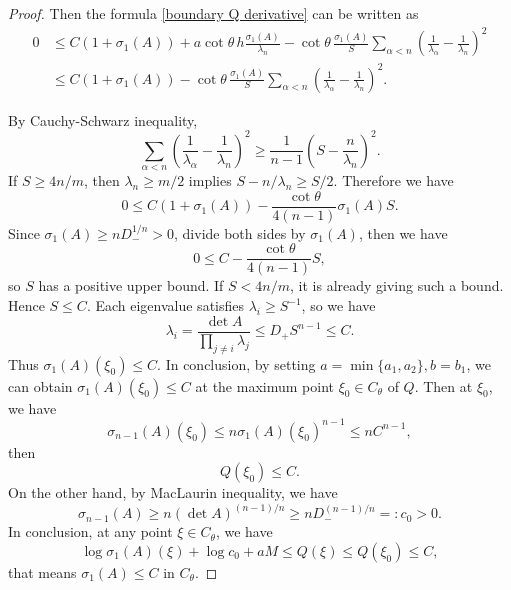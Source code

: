 \documentclass[10pt,a4paper]{amsart}
\begin{document}
\begin{proof}
Then the formula \eqref{boundary Q derivative} can be written as
\begin{equation}\label{boundary inequality} 
\begin{split}
        0&\leq 
        C(1+\sigma_1(A))
        +a\cot\theta\,h\frac{\sigma_1(A)}{\lambda_n}-\cot\theta\,\frac{\sigma_1(A)}{S}
        \sum_{\alpha<n}\left(\frac1{\lambda_{\alpha}}
        -\frac1{\lambda_n}\right)^2\\
        &\leq 
        C(1+\sigma_1(A))-\cot\theta\,\frac{\sigma_1(A)}{S}
        \sum_{\alpha<n}\left(\frac1{\lambda_{\alpha}}
        -\frac1{\lambda_n}\right)^2.
\end{split}
\end{equation}

By Cauchy-Schwarz inequality,
\[
        \sum_{\alpha<n}\left(\frac1{\lambda_{\alpha}}
        -\frac1{\lambda_n}\right)^2
        \geq\frac1{n-1}\left(S-\frac n{\lambda_n}\right)^2.
\]
If $S\geq4n/m$, then $\lambda_n\geq m/2$ implies
$S-n/\lambda_n\geq S/2$. Therefore we have
\begin{equation}\label{s4-4}
        0\leq C(1+\sigma_1(A))
        -\frac{\cot\theta}{4(n-1)}\sigma_1(A)S.
\end{equation}
Since $\sigma_1(A)\geq nD_-^{1/n}>0$, divide both sides by $\sigma_1(A)$, then we have
$$0\leq C - \frac{\cot\theta}{4(n-1)}S,$$
so $S$ has a positive upper bound. If $S<4n/m$, it is already giving such a bound.
Hence $S\leq C$. Each eigenvalue satisfies
$\lambda_i\geq S^{-1}$, so we have
\[
        \lambda_i
        =\frac{\det A}{\prod_{j\ne i}\lambda_j}
        \leq D_+S^{n-1}\leq C.
\]
Thus $\sigma_1(A)(\xi_0)\leq C$. In conclusion, by setting $a=\min\{a_1, a_2\}, b=b_1$, we can obtain $\sigma_1(A)(\xi_0)\leq C$ at the maximum point $\xi_0\in C_{\theta}$ of $Q$. Then at $\xi_0$, we have 
$$\sigma_{n-1}(A)(\xi_0)\leq n\sigma_1(A)(\xi_0)^{n-1}\leq nC^{n-1},$$
then 
$$Q(\xi_0)\leq C.$$
On the other hand, by MacLaurin inequality, we have
$$\sigma_{n-1}(A)\geq n(\det A)^{(n-1)/n}\geq nD^{(n-1)/n}_-=: c_0>0.$$
In conclusion, at any point $\xi\in C_{\theta}$, we have 
$$\log \sigma_1(A)(\xi) + \log c_0 +aM\leq Q(\xi)\leq Q(\xi_0)\leq C,$$
that means $\sigma_1(A)\leq C$ in $C_{\theta}$.
\end{proof}
\end{document}
